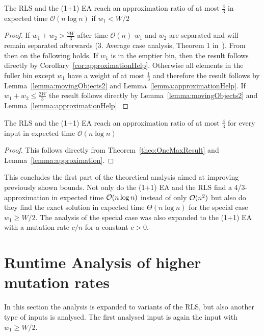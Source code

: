 \begin{lemma}\label{lemma:approximation}
    The RLS and the (1+1) EA reach an approximation ratio of at most $\frac{4}{3}$ in expected time $\mathcal{O}(n\log{}n)$ if $w_1 < W/2$
\end{lemma}
\begin{proof}
    If \(w_1+w_2 > \frac{2W}{3}\) after time $\mathcal{O}(n)$ $w_1$ and $w_2$ are separated and will remain separated afterwards (3. Average case analysis, Theorem 1 in~\cite{witt2005worst}).
    From then on the following holds.
    If $w_1$ is in the emptier bin, then the result follows directly by Corollary~\ref{cor:approximationHelp}.
    Otherwise all elements in the fuller bin except $w_1$ have a weight of at most $\frac{1}{3}$ and therefore the result follows by Lemma~\ref{lemma:movingObjects2} and Lemma~\ref{lemma:approximationHelp}.
    If \(w_1+w_2 \le \frac{2W}{3}\) the result follows directly by Lemma~\ref{lemma:movingObjects2} and Lemma~\ref{lemma:approximationHelp}.
\end{proof}

\begin{corollary}
    The RLS and the (1+1) EA reach an approximation ratio of at most $\frac{4}{3}$ for every input in expected time $\mathcal{O}(n\log{}n)$
\end{corollary}
\begin{proof}
    This follows directly from Theorem~\ref{theo:OneMaxResult} and Lemma~\ref{lemma:approximation}.
\end{proof}

This concludes the first part of the theoretical analysis aimed at improving previously shown bounds.
Not only do the (1+1) EA and the RLS find a 4/3-approximation in expected time $\mathcal{O}(n\log{n})$ instead of only $\mathcal{O}(n^2)$ but also do they find the exact solution in expected time $\Theta(n\log{n})$ for the special case $w_1\ge W/2$.
The analysis of the special case was also expanded to the (1+1) EA with a mutation rate $c/n$ for a constant $c>0$.

\section{Runtime Analysis of higher mutation rates}

In this section the analysis is expanded to variants of the RLS, but also another type of inputs is analysed.
The first analysed input is again the input with $w_1\ge W/2$.

